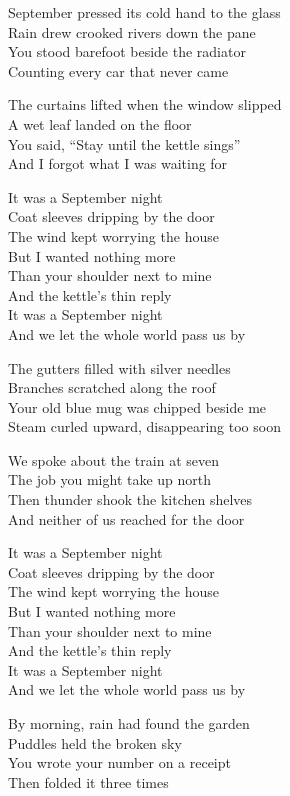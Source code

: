\begin{lyrics}
September pressed its cold hand to the glass\\
Rain drew crooked rivers down the pane\\
You stood barefoot beside the radiator\\
Counting every car that never came

The curtains lifted when the window slipped\\
A wet leaf landed on the floor\\
You said, “Stay until the kettle sings”\\
And I forgot what I was waiting for

It was a September night\\
Coat sleeves dripping by the door\\
The wind kept worrying the house\\
But I wanted nothing more\\
Than your shoulder next to mine\\
And the kettle’s thin reply\\
It was a September night\\
And we let the whole world pass us by

The gutters filled with silver needles\\
Branches scratched along the roof\\
Your old blue mug was chipped beside me\\
Steam curled upward, disappearing too soon

We spoke about the train at seven\\
The job you might take up north\\
Then thunder shook the kitchen shelves\\
And neither of us reached for the door

It was a September night\\
Coat sleeves dripping by the door\\
The wind kept worrying the house\\
But I wanted nothing more\\
Than your shoulder next to mine\\
And the kettle’s thin reply\\
It was a September night\\
And we let the whole world pass us by

By morning, rain had found the garden\\
Puddles held the broken sky\\
You wrote your number on a receipt\\
Then folded it three times


\end{lyrics}
